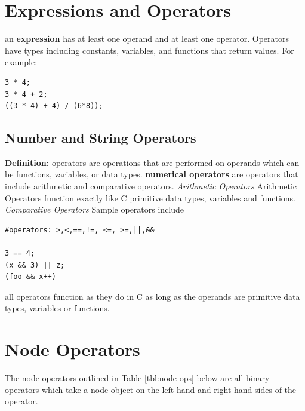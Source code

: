 \documentclass{article}
\begin{document}
\section{Expressions and Operators}

an \textbf{expression} has at least one operand and at least one operator. Operators have types including constants, variables, and functions that return values. For example:

\begin{lstlisting}[language=pltLang, caption=demonstration of expressions and subexpressions, label=lst:expr]
3 * 4; 
3 * 4 + 2;
((3 * 4) + 4) / (6*8));

\end{lstlisting} 

\subsection{Number and String Operators}

\textbf{Definition:} operators are operations that are performed on operands which can be functions, variables, or data types. 
\textbf{numerical operators} are operators that include arithmetic and comparative operators.
\emph{Arithmetic Operators}
Arithmetic Operators function exactly like C primitive data types, variables and functions.\\ 

\emph{Comparative Operators}
 Sample operators include 
\begin{lstlisting}[language=pltLang, caption=Declaration of ``string'' types., label=lst:ops]
#operators: >,<,==,!=, <=, >=,||,&&

3 == 4; 
(x && 3) || z;
(foo && x++)
\end{lstlisting}

all operators function as they do in C as long as the operands are primitive data types, variables or functions. 

\section{Node Operators}

The node operators outlined in Table \ref{tbl:node-ops} below are all binary operators which take a node object on the left-hand and right-hand sides of the operator.
\end{document}
